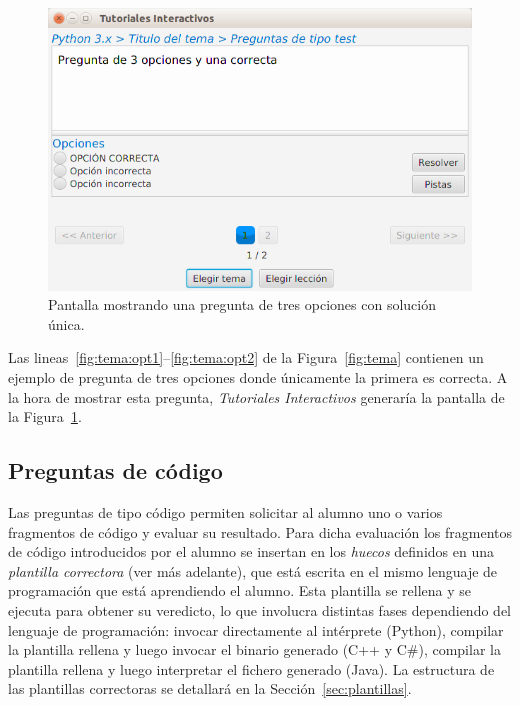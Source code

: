 \documentclass[]{article}
\newcommand{\toolname}{\emph{Tutoriales Interactivos}}
\begin{document}
\begin{figure}[tb]
	\centerline{\includegraphics[scale=0.5]{opciones}}
	\caption{Pantalla mostrando una pregunta de tres opciones con solución única.\label{fig:opciones}}
\end{figure}

Las lineas~\ref{fig:tema:opt1}--\ref{fig:tema:opt2} de la Figura~\ref{fig:tema} contienen un ejemplo de pregunta de tres opciones donde únicamente la primera es correcta. A la hora de mostrar esta pregunta, \toolname{} generaría la pantalla de la Figura~\ref{fig:opciones}.

\subsection{Preguntas de código}
Las preguntas de tipo código permiten solicitar al alumno uno o varios fragmentos de código y evaluar su resultado. Para dicha evaluación los fragmentos de código introducidos por el alumno se insertan en los \emph{huecos} definidos en una \emph{plantilla correctora} (ver más adelante), que está escrita en el mismo lenguaje de programación que está aprendiendo el alumno. Esta plantilla se rellena y se ejecuta para obtener su veredicto, lo que involucra distintas fases dependiendo del lenguaje de programación: invocar directamente al intérprete (Python), compilar la plantilla rellena y luego invocar el binario generado (C++ y C\#), compilar la plantilla rellena y luego interpretar el fichero generado (Java). La estructura de las plantillas correctoras se detallará en la Sección~\ref{sec:plantillas}.
\end{document}
